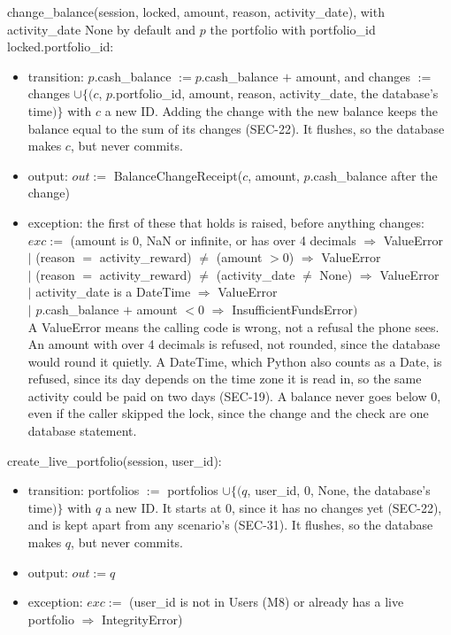 \documentclass[12pt, titlepage]{article}
\begin{document}
\noindent change\_balance(session, locked, amount, reason, activity\_date),
with activity\_date None by default and $p$ the portfolio with portfolio\_id
locked.portfolio\_id:
\begin{itemize}
\item transition: $p$.cash\_balance $:= p$.cash\_balance $+$ amount, and changes
  $:=$ changes $\cup \{(c$, $p$.portfolio\_id, amount, reason, activity\_date,
  the database's time$)\}$ with $c$ a new ID. Adding the change with the new
  balance keeps the balance equal to the sum of its changes (SEC-22). It
  flushes, so the database makes $c$, but never commits.
\item output: $out :=$ BalanceChangeReceipt($c$, amount, $p$.cash\_balance
  after the change)
\item exception: the first of these that holds is raised, before anything
  changes:\\
  \hspace*{1em}$exc :=$ (amount is 0, NaN or infinite, or has over 4 decimals
  $\Rightarrow$ ValueError\\
  \hspace*{1em}$|$ (reason $=$ activity\_reward) $\neq$ (amount $> 0$)
  $\Rightarrow$ ValueError\\
  \hspace*{1em}$|$ (reason $=$ activity\_reward) $\neq$ (activity\_date $\neq$
  None) $\Rightarrow$ ValueError\\
  \hspace*{1em}$|$ activity\_date is a DateTime $\Rightarrow$ ValueError\\
  \hspace*{1em}$|$ $p$.cash\_balance $+$ amount $< 0$ $\Rightarrow$
  InsufficientFundsError$)$\\
  A ValueError means the calling code is wrong, not a refusal the phone sees.
  An amount with over 4 decimals is refused, not rounded, since the database
  would round it quietly. A DateTime, which Python also counts as a Date, is
  refused, since its day depends on the time zone it is read in, so the same
  activity could be paid on two days (SEC-19). A balance never goes below 0, even if the caller skipped the lock,
  since the change and the check are one database statement.
\end{itemize}

\noindent create\_live\_portfolio(session, user\_id):
\begin{itemize}
\item transition: portfolios $:=$ portfolios $\cup \{(q$, user\_id, 0, None, the
  database's time$)\}$ with $q$ a new ID. It starts at 0, since it has no
  changes yet (SEC-22), and is kept apart from any scenario's (SEC-31). It flushes, so the database makes $q$, but never
  commits.
\item output: $out := q$
\item exception: $exc :=$ (user\_id is not in Users (M8) or already has a live
  portfolio $\Rightarrow$ IntegrityError)
\end{itemize}
\end{document}
